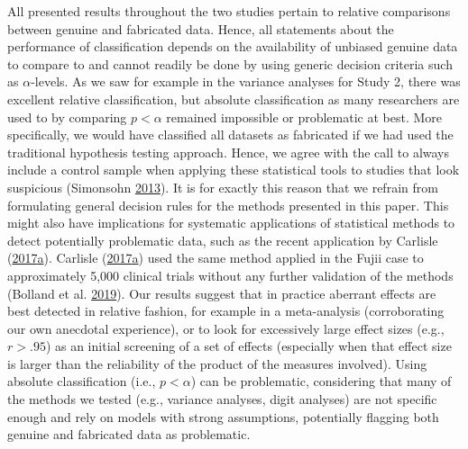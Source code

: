\documentclass[a5paper]{book}
\begin{document}
All presented results throughout the two studies pertain to relative
comparisons between genuine and fabricated data. Hence, all statements
about the performance of classification depends on the availability of
unbiased genuine data to compare to and cannot readily be done by using
generic decision criteria such as \(\alpha\)-levels. As we saw for
example in the variance analyses for Study 2, there was excellent
relative classification, but absolute classification as many researchers
are used to by comparing \(p<\alpha\) remained impossible or problematic
at best. More specifically, we would have classified all datasets as
fabricated if we had used the traditional hypothesis testing approach.
Hence, we agree with the call to always include a control sample when
applying these statistical tools to studies that look suspicious
(Simonsohn
\protect\hyperlink{ref-doi:10.1177ux2f0956797613480366}{2013}). It is
for exactly this reason that we refrain from formulating general
decision rules for the methods presented in this paper. This might also
have implications for systematic applications of statistical methods to
detect potentially problematic data, such as the recent application by
Carlisle
(\protect\hyperlink{ref-doi:10.1111ux2fanae.13938}{2017}\protect\hyperlink{ref-doi:10.1111ux2fanae.13938}{a}).
Carlisle
(\protect\hyperlink{ref-doi:10.1111ux2fanae.13938}{2017}\protect\hyperlink{ref-doi:10.1111ux2fanae.13938}{a})
used the same method applied in the Fujii case to approximately 5,000
clinical trials without any further validation of the methods (Bolland
et al.
\protect\hyperlink{ref-doi:10.1016ux2fj.jclinepi.2019.03.001}{2019}).
Our results suggest that in practice aberrant effects are best detected
in relative fashion, for example in a meta-analysis (corroborating our
own anecdotal experience), or to look for excessively large effect sizes
(e.g., \(r>.95\)) as an initial screening of a set of effects
(especially when that effect size is larger than the reliability of the
product of the measures involved). Using absolute classification (i.e.,
\(p<\alpha\)) can be problematic, considering that many of the methods
we tested (e.g., variance analyses, digit analyses) are not specific
enough and rely on models with strong assumptions, potentially flagging
both genuine and fabricated data as problematic.
\end{document}
